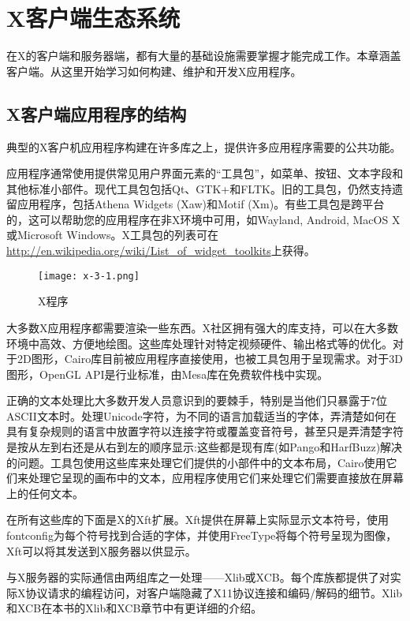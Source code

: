 \section{X客户端生态系统}

在X的客户端和服务器端，都有大量的基础设施需要掌握才能完成工作。本章涵盖客户端。从这里开始学习如何构建、维护和开发X应用程序。

\subsection{X客户端应用程序的结构}

典型的X客户机应用程序构建在许多库之上，提供许多应用程序需要的公共功能。

应用程序通常使用提供常见用户界面元素的“工具包”，如菜单、按钮、文本字段和其他标准小部件。现代工具包包括Qt、GTK+和FLTK。旧的工具包，仍然支持遗留应用程序，包括Athena Widgets (Xaw)和Motif (Xm)。有些工具包是跨平台的，这可以帮助您的应用程序在非X环境中可用，如Wayland, Android, MacOS X或Microsoft Windows。X工具包的列表可在\url{http://en.wikipedia.org/wiki/List_of_widget_toolkits}上获得。

\begin{figure}[h]
	\centering
	\texttt{[image: x-3-1.png]}
	\caption{X程序}
	\label{img-1.3.1-1}
\end{figure}

大多数X应用程序都需要渲染一些东西。X社区拥有强大的库支持，可以在大多数环境中高效、方便地绘图。这些库处理针对特定视频硬件、输出格式等的优化。对于2D图形，Cairo库目前被应用程序直接使用，也被工具包用于呈现需求。对于3D图形，OpenGL API是行业标准，由Mesa库在免费软件栈中实现。

正确的文本处理比大多数开发人员意识到的要棘手，特别是当他们只暴露于7位ASCII文本时。处理Unicode字符，为不同的语言加载适当的字体，弄清楚如何在具有复杂规则的语言中放置字符以连接字符或覆盖变音符号，甚至只是弄清楚字符是按从左到右还是从右到左的顺序显示:这些都是现有库(如Pango和HarfBuzz)解决的问题。工具包使用这些库来处理它们提供的小部件中的文本布局，Cairo使用它们来处理它呈现的画布中的文本，应用程序使用它们来处理它们需要直接放在屏幕上的任何文本。

在所有这些库的下面是X的Xft扩展。Xft提供在屏幕上实际显示文本符号，使用fontconfig为每个符号找到合适的字体，并使用FreeType将每个符号呈现为图像，Xft可以将其发送到X服务器以供显示。

与X服务器的实际通信由两组库之一处理——Xlib或XCB。每个库族都提供了对实际X协议请求的编程访问，对客户端隐藏了X11协议连接和编码/解码的细节。Xlib和XCB在本书的Xlib和XCB章节中有更详细的介绍。

